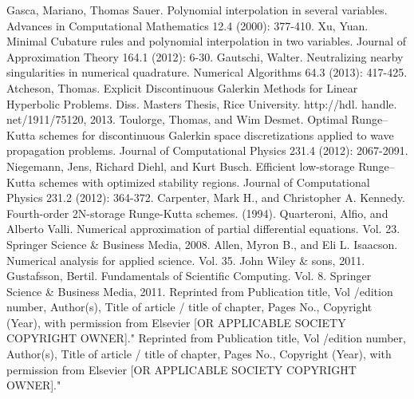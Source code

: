 \documentclass[letterpaper,12pt]{report}
\begin{document}
\begin{thebibliography}{9}
Gasca, Mariano, Thomas Sauer. Polynomial interpolation in several variables. Advances in Computational Mathematics 12.4 (2000): 377-410.
Xu, Yuan. Minimal Cubature rules and polynomial interpolation in two variables. Journal of Approximation Theory 164.1 (2012): 6-30.
Gautschi, Walter. Neutralizing nearby singularities in numerical quadrature. Numerical Algorithms 64.3 (2013): 417-425.
Atcheson, Thomas. Explicit Discontinuous Galerkin Methods for Linear Hyperbolic Problems. Diss. Masters Thesis, Rice University. http://hdl. handle. net/1911/75120, 2013.
Toulorge, Thomas, and Wim Desmet. Optimal Runge–Kutta schemes for discontinuous Galerkin space discretizations applied to wave propagation problems. Journal of Computational Physics 231.4 (2012): 2067-2091.
Niegemann, Jens, Richard Diehl, and Kurt Busch. Efficient low-storage Runge–Kutta schemes with optimized stability regions. Journal of Computational Physics 231.2 (2012): 364-372.
Carpenter, Mark H., and Christopher A. Kennedy. Fourth-order 2N-storage Runge-Kutta schemes. (1994).
Quarteroni, Alfio, and Alberto Valli. Numerical approximation of partial differential equations. Vol. 23. Springer Science \& Business Media, 2008.
Allen, Myron B., and Eli L. Isaacson. Numerical analysis for applied science. Vol. 35. John Wiley \& sons, 2011.
Gustafsson, Bertil. Fundamentals of Scientific Computing. Vol. 8. Springer Science \& Business Media, 2011.
Reprinted from Publication title, Vol /edition number, Author(s), Title of article / title of chapter, Pages No., Copyright (Year), with permission from Elsevier [OR APPLICABLE SOCIETY COPYRIGHT OWNER]."
Reprinted from Publication title, Vol /edition number, Author(s), Title of article / title of chapter, Pages No., Copyright (Year), with permission from Elsevier [OR APPLICABLE SOCIETY COPYRIGHT OWNER]."


\end{thebibliography}
\end{document}
